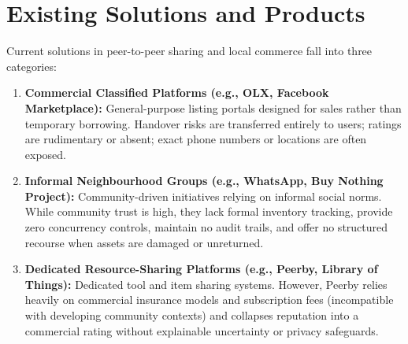 \section{Existing Solutions and Products}
Current solutions in peer-to-peer sharing and local commerce fall into three categories:
\begin{enumerate}
    \item \textbf{Commercial Classified Platforms (e.g., OLX, Facebook Marketplace):} General-purpose listing portals designed for sales rather than temporary borrowing. Handover risks are transferred entirely to users; ratings are rudimentary or absent; exact phone numbers or locations are often exposed.
    \item \textbf{Informal Neighbourhood Groups (e.g., WhatsApp, Buy Nothing Project):} Community-driven initiatives relying on informal social norms. While community trust is high, they lack formal inventory tracking, provide zero concurrency controls, maintain no audit trails, and offer no structured recourse when assets are damaged or unreturned.
    \item \textbf{Dedicated Resource-Sharing Platforms (e.g., Peerby, Library of Things):} Dedicated tool and item sharing systems. However, Peerby relies heavily on commercial insurance models and subscription fees (incompatible with developing community contexts) and collapses reputation into a commercial rating without explainable uncertainty or privacy safeguards.
\end{enumerate}


